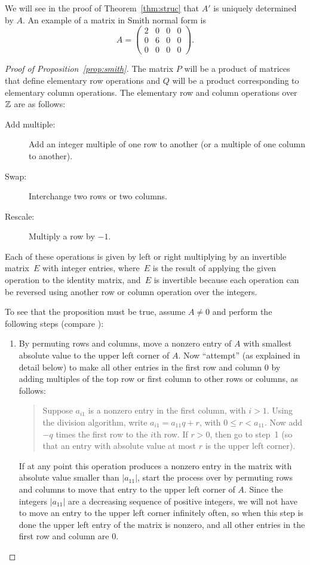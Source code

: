 We will see in the proof of Theorem~\ref{thm:struc} that
$A'$ is uniquely determined by $A$.
An example of a matrix in Smith normal form is
$$
	A=\left(\begin{matrix}
		2&0&0&0\\
		0&6&0&0\\
		0&0&0&0
	\end{matrix}\right).
$$

\begin{proof}[Proof of Proposition~\ref{prop:smith}]
The matrix $P$ will be a product of matrices that define elementary
row operations and $Q$ will be a product corresponding to elementary
column operations.  The elementary row and column operations over
$\mathbb{Z}$ are as follows:
\begin{description}
	\item[Add multiple:]
		Add an integer multiple of one row to another
		(or a multiple of one column to another).
	\item[Swap:]
		Interchange two rows or two columns.
	\item[Rescale:]
		Multiply a row by $-1$.
\end{description}
Each of these operations is given by left or right multiplying by an
invertible matrix~$E$ with integer entries, where~$E$ is the result of
applying the given operation to the identity matrix, and~$E$ is
invertible because each operation can be reversed using another row or
column operation over the integers.

To see that the proposition must be true, assume $A\neq 0$ and perform
the following steps (compare \cite[pg.~459]{artin:algebra}):
\begin{enumerate}
	\item By permuting rows and columns, move a nonzero entry of $A$ with
	smallest absolute value to the upper left corner of $A$.  Now
	``attempt'' (as explained in detail below) to make all other entries
	in the first row and column $0$ by adding multiples of the top row
	or first column to other rows or columns, as follows:
	\begin{quote}
		Suppose $a_{i1}$ is a nonzero entry in the first column, with
		$i>1$.  Using the division algorithm, write
		$a_{i1} = a_{11}q + r$, with $0\leq r < a_{11}$. Now add $-q$
		times the first row to the $i$th row. If $r>0$, then go to step~1
		(so that an entry with absolute value at most $r$ is the upper
		left corner).
	\end{quote}
	If at any point this operation produces a nonzero entry in the
	matrix with absolute value smaller than $|a_{11}|$, start the
	process over by permuting rows and columns to move that entry to the
	upper left corner of $A$.  Since the integers $|a_{11}|$ are a
	decreasing sequence of positive integers, we will not have to move
	an entry to the upper left corner infinitely often, so when this
	step is done the upper left entry of the matrix is nonzero, and all other
	entries in the first row and column are $0$.
	

\end{enumerate}
\end{proof}
